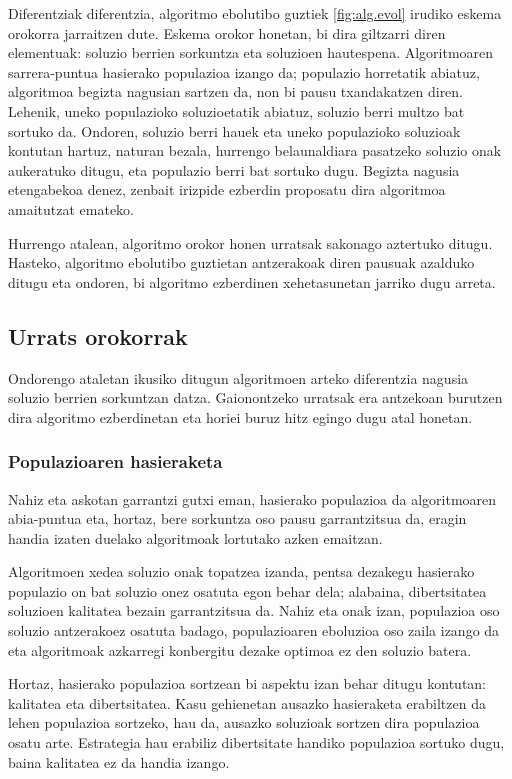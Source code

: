 \documentclass[eu]{ifirak}\usepackage[]{graphicx}\usepackage[]{color}
\begin{document}
Diferentziak diferentzia, algoritmo ebolutibo guztiek \ref{fig:alg.evol} irudiko eskema orokorra jarraitzen dute. Eskema orokor honetan, bi dira giltzarri diren elementuak: soluzio berrien sorkuntza eta soluzioen hautespena. Algoritmoaren sarrera-puntua hasierako populazioa izango da; populazio horretatik abiatuz, algoritmoa begizta nagusian sartzen da, non bi pausu txandakatzen diren. Lehenik, uneko populazioko soluzioetatik abiatuz, soluzio berri multzo bat sortuko da. Ondoren, soluzio berri hauek eta uneko populazioko soluzioak kontutan hartuz, naturan bezala, hurrengo belaunaldiara pasatzeko soluzio onak aukeratuko ditugu, eta populazio berri bat sortuko dugu. Begizta nagusia etengabekoa denez, zenbait irizpide ezberdin proposatu dira algoritmoa amaitutzat emateko.

Hurrengo atalean, algoritmo orokor honen urratsak sakonago aztertuko ditugu. Hasteko, algoritmo ebolutibo guztietan antzerakoak diren pausuak azalduko ditugu eta ondoren, bi algoritmo ezberdinen xehetasunetan jarriko dugu arreta. 

\subsection{Urrats orokorrak}

Ondorengo ataletan ikusiko ditugun algoritmoen arteko diferentzia nagusia soluzio berrien sorkuntzan datza. Gaionontzeko urratsak era antzekoan burutzen dira algoritmo ezberdinetan eta horiei buruz hitz egingo dugu atal honetan.

\subsubsection{Populazioaren hasieraketa}

Nahiz eta askotan garrantzi gutxi eman, hasierako populazioa da algoritmoaren abia-puntua eta, hortaz, bere sorkuntza oso pausu garrantzitsua da, eragin handia izaten duelako algoritmoak lortutako azken emaitzan. 

Algoritmoen xedea soluzio onak topatzea izanda, pentsa dezakegu hasierako populazio on bat soluzio onez osatuta egon behar dela; alabaina, dibertsitatea soluzioen kalitatea bezain garrantzitsua da. Nahiz eta onak izan, populazioa oso soluzio antzerakoez osatuta badago, populazioaren eboluzioa oso zaila izango da eta algoritmoak azkarregi konbergitu dezake optimoa ez den soluzio batera. 

Hortaz, hasierako populazioa sortzean bi aspektu izan behar ditugu kontutan: kalitatea eta dibertsitatea. Kasu gehienetan ausazko hasieraketa erabiltzen da lehen populazioa sortzeko, hau da, ausazko soluzioak sortzen dira populazioa osatu arte. Estrategia hau erabiliz dibertsitate handiko populazioa sortuko dugu, baina kalitatea ez da handia izango. 
\end{document}
